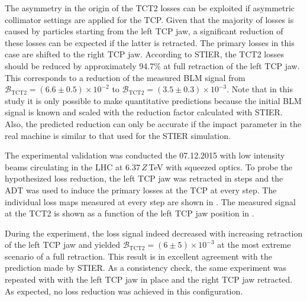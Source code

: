The asymmetry in the origin of the TCT2 losses can be exploited if asymmetric collimator settings are applied for the TCP. Given that the majority of losses is caused by particles starting from the left TCP jaw, a significant reduction of these losses can be expected if the latter is retracted. The primary losses in this case are shifted to the right TCP jaw. According to STIER, the TCT2 losses should be reduced by approximately 94.7\% at full retraction of the left TCP jaw. This corresponds to a reduction of the measured BLM signal from \mbox{$\mathcal{B}_{\text{TCT2}} = (6.6\pm 0.5)\times 10^{-2}$} to \mbox{$\mathcal{B}_{\text{TCT2}} = (3.5 \pm 0.3) \times 10^{-3}$}. Note that in this study it is only possible to make quantitative predictions because the initial BLM signal is known and scaled with the reduction factor calculated with STIER. Also, the predicted reduction can only be accurate if the impact parameter in the real machine is similar to that used for the STIER simulation.













The experimental validation was conducted the 07.12.2015 with low intensity beams circulating in the LHC at 6.37\,$Z$\,TeV with squeezed optics. To probe the hypothesized loss reduction, the left TCP jaw was retracted in steps and the ADT was used to induce the primary losses at the TCP at every step. The individual loss maps measured at every step are shown in . The measured signal at the TCT2 is shown as a function of the left TCP jaw position in .

\newpage

During the experiment, the loss signal indeed decreased with increasing retraction of the left TCP jaw and yielded $\mathcal{B}_\text{TCT2}=(6 \pm  5 )\times 10^{-3}$ at the most extreme scenario of a full retraction. This result is in excellent agreement with the prediction made by STIER. As a consistency check, the same experiment was repeated with with the left TCP jaw in place and the right TCP jaw retracted. As expected, no loss reduction was achieved in this configuration.

